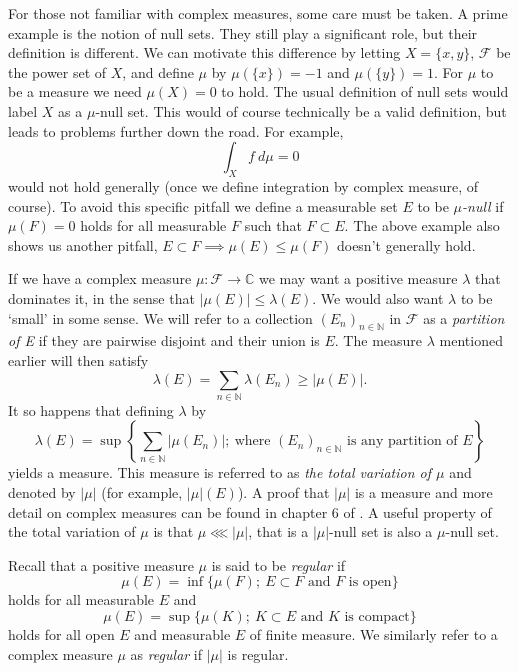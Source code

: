 \documentclass[a4paper,12pt,twoside,BCOR=10mm]{scrbook}
\theoremstyle{definition}
\theoremstyle{definition}
\theoremstyle{definition}
\begin{document}
For those not familiar with complex measures, some care must be taken.
A prime example is the notion of null sets.
They still play a significant role, but their definition is different.
We can motivate this difference by letting $X = \{x, y\}$, $\mathcal{F}$ be the power set of $X$, and define $\mu$ by $\mu(\{x\}) = -1$ and $\mu(\{y\}) = 1$.
For $\mu$ to be a measure we need $\mu(X) = 0$ to hold.
The usual definition of null sets would label $X$ as a $\mu$-null set.
This would of course technically be a valid definition, but leads to problems further down the road.
For example,
\[
	\int_X f\ d\mu = 0
\]
would not hold generally (once we define integration by complex measure, of course).
To avoid this specific pitfall we define a measurable set $E$ to be \emph{$\mu$-null} if $\mu(F) = 0$ holds for all measurable $F$ such that $F \subset E$.
The above example also shows us another pitfall, $E \subset F \implies \mu(E) \leq \mu(F)$ doesn't generally hold.

If we have a complex measure $\mu: \mathcal{F} \rightarrow \mathbb{C}$ we may want a positive measure $\lambda$ that dominates it, in the sense that $|\mu(E)| \leq \lambda(E)$.
We would also want $\lambda$ to be `small' in some sense.
We will refer to a collection $(E_n)_{n \in \mathbb{N}}$ in $\mathcal{F}$ as a \emph{partition of E} if they are pairwise disjoint and their union is $E$.
The measure $\lambda$ mentioned earlier will then satisfy
\[
	\lambda(E) = \sum_{n \in \mathbb{N}} \lambda(E_n) \geq |\mu(E)|.
\]
It so happens that defining $\lambda$ by
\[
	\lambda(E) = \sup \left \{\sum_{n \in \mathbb{N}}|\mu(E_n)|;\ \text{where }(E_n)_{n \in \mathbb{N}}\text{ is any partition of }E \right \}
\]
yields a measure.
This measure is referred to as \emph{\label{index2} the total variation of $\mu$} and denoted by $|\mu|$ (for example, $|\mu|(E)$).
A proof that $|\mu|$ is a measure and more detail on complex measures can be found in chapter $6$ of \citep{rudin2}. 
A useful property of the total variation of $\mu$ is that $\mu \lll |\mu|$, that is a $|\mu|$-null set is also a $\mu$-null set.

\label{index20}
Recall that a positive measure $\mu$ is said to be \emph{regular} if
\[
	\mu(E) = \inf\{\mu(F);\ E \subset F \text{ and $F$ is open}\}
\]
holds for all measurable $E$ and
\[
	\mu(E) = \sup\{\mu(K);\ K \subset E \text{ and $K$ is compact}\}
\]
holds for all open $E$ and measurable $E$ of finite measure.
We similarly refer to a complex measure $\mu$ as \emph{regular} if $|\mu|$ is regular.
\end{document}
